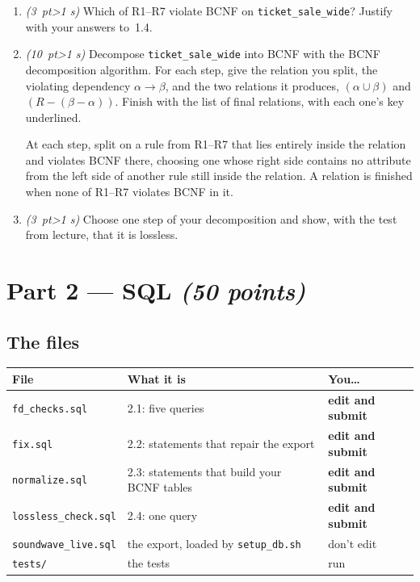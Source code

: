 \documentclass[11pt]{article}
\newcommand{\code}[1]{\texttt{#1}}
\newcommand{\pt}[1]{\textit{(#1~pt\ifnum#1>1 s\fi)}}
\begin{document}
\begin{enumerate}[label=(\alph*)]
  \item \pt{3} Which of R1--R7 violate BCNF on \code{ticket\_sale\_wide}?
  Justify with your answers to~1.4.

  \item \pt{10} Decompose \code{ticket\_sale\_wide} into BCNF with the BCNF
  decomposition algorithm. For each step, give the relation you split, the
  violating dependency $\alpha \rightarrow \beta$, and the two relations it
  produces, $(\alpha \cup \beta)$ and $(R - (\beta - \alpha))$. Finish with
  the list of final relations, with each one's key underlined.

  At each step, split on a rule from R1--R7 that lies entirely inside the
  relation and violates BCNF there, choosing one whose right side contains no
  attribute from the left side of another rule still inside the relation. A
  relation is finished when none of R1--R7 violates BCNF in it.

  \item \pt{3} Choose one step of your decomposition and show, with the test
  from lecture, that it is lossless.
\end{enumerate}

\newpage
\section*{Part 2 --- SQL \hfill \textit{(50 points)}}

\subsection*{The files}

\begin{center}
\begin{tabularx}{\linewidth}{@{}l X l@{}}
\toprule
\textbf{File} & \textbf{What it is} & \textbf{You\ldots}\\
\midrule
\code{fd\_checks.sql}      & 2.1: five queries                         & \textbf{edit and submit}\\
\code{fix.sql}             & 2.2: statements that repair the export    & \textbf{edit and submit}\\
\code{normalize.sql}       & 2.3: statements that build your BCNF tables & \textbf{edit and submit}\\
\code{lossless\_check.sql} & 2.4: one query                            & \textbf{edit and submit}\\
\code{soundwave\_live.sql} & the export, loaded by \code{setup\_db.sh}  & don't edit\\
\code{tests/}              & the tests                                 & run\\
\bottomrule
\end{tabularx}
\end{center}
\end{document}
